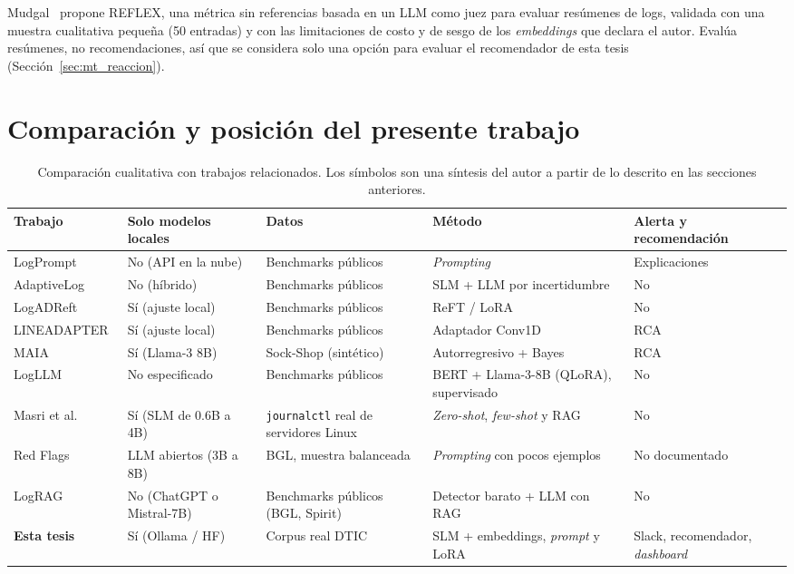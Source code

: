 Mudgal~\cite{mudgal2025_reflex} propone REFLEX, una métrica sin referencias basada en un LLM como juez para evaluar resúmenes de logs, validada con una muestra cualitativa pequeña (50 entradas) y con las limitaciones de costo y de sesgo de los \textit{embeddings} que declara el autor. Evalúa resúmenes, no recomendaciones, así que se considera solo una opción para evaluar el recomendador de esta tesis (Sección~\ref{sec:mt_reaccion}).

\section{Comparación y posición del presente trabajo}\label{sec:tr_comparacion}

\begin{table}[H]
\centering
\caption{Comparación cualitativa con trabajos relacionados. Los símbolos son una síntesis del autor a partir de lo descrito en las secciones anteriores.}
\label{tab:tr_comparacion}
\small
\begin{tabular}{@{}p{3.2cm}p{2.2cm}p{2.4cm}p{3.4cm}p{3.2cm}@{}}
\toprule
\textbf{Trabajo} & \textbf{Solo modelos locales} & \textbf{Datos} & \textbf{Método} & \textbf{Alerta y recomendación} \\
\midrule
LogPrompt~\cite{liu2024_logprompt} & No (API en la nube) & Benchmarks públicos & \textit{Prompting} & Explicaciones \\
AdaptiveLog~\cite{ma2026_adaptivelog} & No (híbrido) & Benchmarks públicos & SLM + LLM por incertidumbre & No \\
LogADReft~\cite{lim2025_logadreft} & Sí (ajuste local) & Benchmarks públicos & ReFT / LoRA & No \\
LINEADAPTER~\cite{liu2025_lineadapter} & Sí (ajuste local) & Benchmarks públicos & Adaptador Conv1D & RCA \\
MAIA~\cite{pedroso2025_maia} & Sí (Llama-3 8B) & Sock-Shop (sintético) & Autorregresivo + Bayes & RCA \\
LogLLM~\cite{guan2024_logllm} & No especificado & Benchmarks públicos & BERT + Llama-3-8B (QLoRA), supervisado & No \\
Masri et al.~\cite{masri2026_slm_severity} & Sí (SLM de 0.6B a 4B) & \texttt{journalctl} real de servidores Linux & \textit{Zero-shot}, \textit{few-shot} y RAG & No \\
Red Flags~\cite{anastasiadis2026_redflags} & LLM abiertos (3B a 8B) & BGL, muestra balanceada & \textit{Prompting} con pocos ejemplos & No documentado \\
LogRAG~\cite{zhang2024_lograg} & No (ChatGPT o Mistral-7B) & Benchmarks públicos (BGL, Spirit) & Detector barato + LLM con RAG & No \\
\textbf{Esta tesis} & Sí (Ollama / HF) & Corpus real DTIC & SLM + embeddings, \textit{prompt} y LoRA & Slack, recomendador, \textit{dashboard} \\
\bottomrule
\end{tabular}
\normalsize
\end{table}

